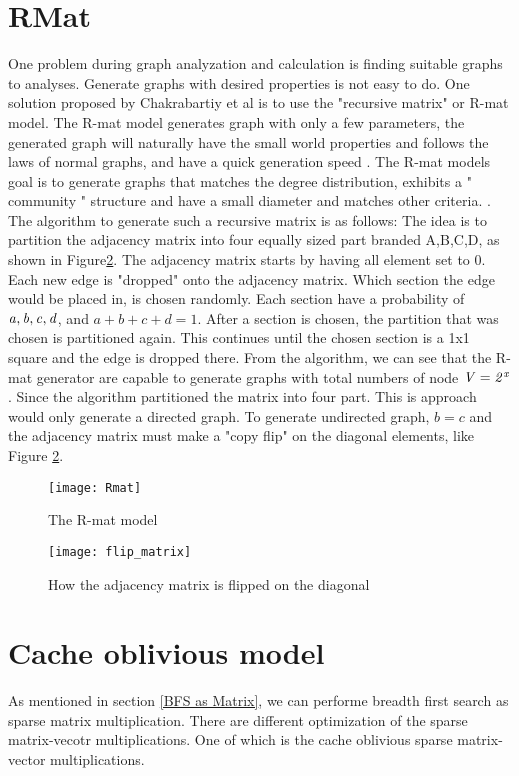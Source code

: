 {\section{RMat}
One problem during graph analyzation and calculation is finding suitable graphs to analyses. Generate graphs with desired properties is not easy to do. One solution proposed by Chakrabartiy et al is to use the "recursive matrix" or R-mat model. The R-mat model generates graph with only a few parameters, the generated graph will naturally have the small world properties and follows the laws of normal graphs, and have a quick generation speed \cite{Rmat2004}. The R-mat models goal is to generate graphs that matches the degree distribution, exhibits a " community " structure and have a small diameter and matches other criteria. \cite{Rmat2004}. The algorithm to generate such a recursive matrix is as follows: The idea is to partition the adjacency matrix into four equally sized part branded A,B,C,D, as shown in Figure\ref{fig:flipDiagonal}. The adjacency matrix starts by having all element set to 0. Each new edge is "dropped" onto the adjacency matrix. Which section the edge would be placed in, is chosen randomly. Each section have a probability of $\it{a, b, c, d}$, and $a + b + c + d = 1$. After a section is chosen, the partition that was chosen is partitioned again. This continues until the chosen section is a 1x1 square and the edge is dropped there. From the algorithm, we can see that the R-mat generator are capable to generate graphs with total numbers of node $ \it{V} = 2^x$. Since the algorithm partitioned the matrix into four part. This is approach would only generate a directed graph. To generate undirected graph, $b = c$ and the adjacency matrix must make a "copy flip" on the diagonal elements, like Figure \ref{fig:flipDiagonal}. 


\begin{figure}
\texttt{[image: Rmat]}
\caption{The R-mat model \cite{Rmat2004}}
\label{fig:Rmat}
\end{figure}

\begin{figure}
\texttt{[image: flip\_matrix]}
\caption{How the adjacency matrix is flipped on the diagonal}
\label{fig:flipDiagonal}

\end{figure}



\section{Cache oblivious model} 
As mentioned in section \ref{BFS as Matrix}, we can performe breadth first search as sparse matrix multiplication. There are different optimization of the sparse matrix-vecotr  multiplications. One of which is the cache oblivious sparse matrix-vector multiplications.

}
